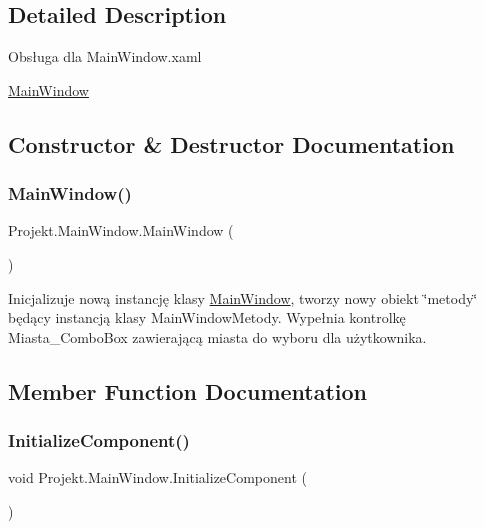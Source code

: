 \subsection{Detailed Description}
Obsługa dla Main\+Window.\+xaml 

\mbox{\hyperlink{class_projekt_1_1_main_window}{Main\+Window}}

\subsection{Constructor \& Destructor Documentation}
\mbox{\label{class_projekt_1_1_main_window_a89444390c3a3744103a7c26465058420}} 
\subsubsection{\texorpdfstring{MainWindow()}{MainWindow()}}
{\footnotesize\ttfamily Projekt.\+Main\+Window.\+Main\+Window (\begin{DoxyParamCaption}{ }\end{DoxyParamCaption})}



Inicjalizuje nową instancję klasy \mbox{\hyperlink{class_projekt_1_1_main_window}{Main\+Window}}, tworzy nowy obiekt \char`\"{}metody\char`\"{} będący instancją klasy Main\+Window\+Metody. Wypełnia kontrolkę Miasta\+\_\+\+Combo\+Box zawierającą miasta do wyboru dla użytkownika. 



\subsection{Member Function Documentation}
\mbox{\label{class_projekt_1_1_main_window_a77dc8af65f12c129fb0c59a57d52f46d}} 
\subsubsection{\texorpdfstring{InitializeComponent()}{InitializeComponent()}\hspace{0.1cm}{\footnotesize\ttfamily [1/3]}}
{\footnotesize\ttfamily void Projekt.\+Main\+Window.\+Initialize\+Component (\begin{DoxyParamCaption}{ }\end{DoxyParamCaption})}



